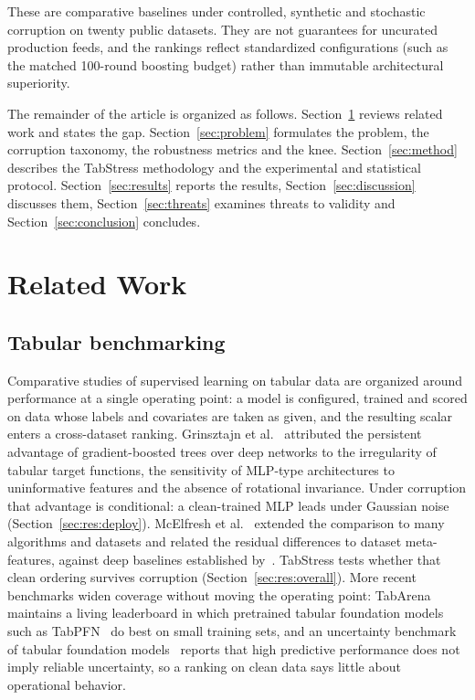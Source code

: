 \documentclass[pdflatex,sn-mathphys]{sn-jnl}
\theoremstyle{thmstyleone}
\theoremstyle{thmstyletwo}
\theoremstyle{thmstylethree}
\begin{document}
These are comparative baselines under controlled, synthetic and stochastic corruption on twenty public datasets. They are not guarantees for uncurated production feeds, and the rankings reflect standardized configurations (such as the matched 100-round boosting budget) rather than immutable architectural superiority.

The remainder of the article is organized as follows. Section~\ref{sec:related} reviews related work and states the gap. Section~\ref{sec:problem} formulates the problem, the corruption taxonomy, the robustness metrics and the knee. Section~\ref{sec:method} describes the TabStress methodology and the experimental and statistical protocol. Section~\ref{sec:results} reports the results, Section~\ref{sec:discussion} discusses them, Section~\ref{sec:threats} examines threats to validity and Section~\ref{sec:conclusion} concludes.

\section{Related Work}\label{sec:related}

\subsection{Tabular benchmarking}\label{sec:related:benchmarks}

Comparative studies of supervised learning on tabular data are organized around performance at a single operating point: a model is configured, trained and scored on data whose labels and covariates are taken as given, and the resulting scalar enters a cross-dataset ranking. Grinsztajn et al.~\cite{grinsztajn2022tree} attributed the persistent advantage of gradient-boosted trees over deep networks to the irregularity of tabular target functions, the sensitivity of MLP-type architectures to uninformative features and the absence of rotational invariance. Under corruption that advantage is conditional: a clean-trained MLP leads under Gaussian noise (Section~\ref{sec:res:deploy}). McElfresh et al.~\cite{mcelfresh2023when} extended the comparison to many algorithms and datasets and related the residual differences to dataset meta-features, against deep baselines established by~\cite{gorishniy2021revisiting,borisov2024deep}. TabStress tests whether that clean ordering survives corruption (Section~\ref{sec:res:overall}). More recent benchmarks widen coverage without moving the operating point: TabArena~\cite{nick2025tabarena} maintains a living leaderboard in which pretrained tabular foundation models such as TabPFN~\cite{hollmann2023tabpfn,hollmann2025accurate} do best on small training sets, and an uncertainty benchmark of tabular foundation models~\cite{jos2026high} reports that high predictive performance does not imply reliable uncertainty, so a ranking on clean data says little about operational behavior.
\end{document}
